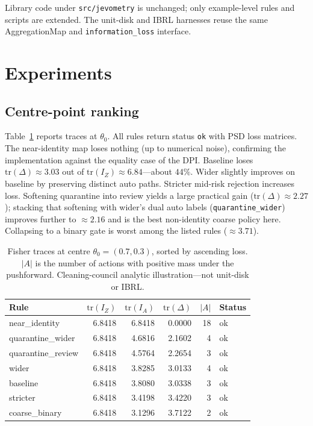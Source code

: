 \documentclass[11pt,a4paper]{article}
\begin{document}
Library code under \texttt{src/jevometry} is unchanged; only example-level
rules and scripts are extended. The unit-disk and IBRL harnesses reuse the
same AggregationMap and \texttt{information\_loss} interface.

\section{Experiments}
\label{sec:experiments}

\subsection{Centre-point ranking}

Table~\ref{tab:center} reports traces at $\theta_0$. All rules return status
\texttt{ok} with PSD loss matrices. The near-identity map loses nothing (up to
numerical noise), confirming the implementation against the equality case of
the DPI. Baseline loses $\mathrm{tr}(\Delta)\approx 3.03$ out of
$\mathrm{tr}(I_Z)\approx 6.84$---about $44\%$. Wider slightly improves on
baseline by preserving distinct auto paths. Stricter mid-risk rejection
increases loss. Softening quarantine into review yields a large practical gain
($\mathrm{tr}(\Delta)\approx 2.27$); stacking that softening with wider's dual
auto labels (\texttt{quarantine\_wider}) improves further to
$\approx 2.16$ and is the best non-identity coarse policy here. Collapsing to
a binary gate is worst among the listed rules ($\approx 3.71$).

\begin{table}[t]
\centering
\caption{Fisher traces at centre $\theta_0=(0.7,0.3)$, sorted by ascending
loss. $|A|$ is the number of actions with positive mass under the pushforward.
Cleaning-council analytic illustration---not unit-disk or IBRL.}
\label{tab:center}
\begin{tabular}{lrrrrl}
\toprule
Rule & $\mathrm{tr}(I_Z)$ & $\mathrm{tr}(I_A)$ & $\mathrm{tr}(\Delta)$ & $|A|$ & Status \\
\midrule
near\_identity & 6.8418 & 6.8418 & 0.0000 & 18 & ok \\
quarantine\_wider & 6.8418 & 4.6816 & 2.1602 & 4 & ok \\
quarantine\_review & 6.8418 & 4.5764 & 2.2654 & 3 & ok \\
wider & 6.8418 & 3.8285 & 3.0133 & 4 & ok \\
baseline & 6.8418 & 3.8080 & 3.0338 & 3 & ok \\
stricter & 6.8418 & 3.4198 & 3.4220 & 3 & ok \\
coarse\_binary & 6.8418 & 3.1296 & 3.7122 & 2 & ok \\
\bottomrule
\end{tabular}
\end{table}
\end{document}
